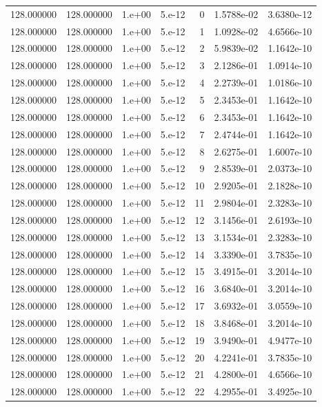 \begin{table}[htbp]
\begin{tabular}{rrrrrrr}
128.000000 & 128.000000 & 1.e+00 & 5.e-12 & 0 & 1.5788e-02 & 3.6380e-12 \\
128.000000 & 128.000000 & 1.e+00 & 5.e-12 & 1 & 1.0928e-02 & 4.6566e-10 \\
128.000000 & 128.000000 & 1.e+00 & 5.e-12 & 2 & 5.9839e-02 & 1.1642e-10 \\
128.000000 & 128.000000 & 1.e+00 & 5.e-12 & 3 & 2.1286e-01 & 1.0914e-10 \\
128.000000 & 128.000000 & 1.e+00 & 5.e-12 & 4 & 2.2739e-01 & 1.0186e-10 \\
128.000000 & 128.000000 & 1.e+00 & 5.e-12 & 5 & 2.3453e-01 & 1.1642e-10 \\
128.000000 & 128.000000 & 1.e+00 & 5.e-12 & 6 & 2.3453e-01 & 1.1642e-10 \\
128.000000 & 128.000000 & 1.e+00 & 5.e-12 & 7 & 2.4744e-01 & 1.1642e-10 \\
128.000000 & 128.000000 & 1.e+00 & 5.e-12 & 8 & 2.6275e-01 & 1.6007e-10 \\
128.000000 & 128.000000 & 1.e+00 & 5.e-12 & 9 & 2.8539e-01 & 2.0373e-10 \\
128.000000 & 128.000000 & 1.e+00 & 5.e-12 & 10 & 2.9205e-01 & 2.1828e-10 \\
128.000000 & 128.000000 & 1.e+00 & 5.e-12 & 11 & 2.9804e-01 & 2.3283e-10 \\
128.000000 & 128.000000 & 1.e+00 & 5.e-12 & 12 & 3.1456e-01 & 2.6193e-10 \\
128.000000 & 128.000000 & 1.e+00 & 5.e-12 & 13 & 3.1534e-01 & 2.3283e-10 \\
128.000000 & 128.000000 & 1.e+00 & 5.e-12 & 14 & 3.3390e-01 & 3.7835e-10 \\
128.000000 & 128.000000 & 1.e+00 & 5.e-12 & 15 & 3.4915e-01 & 3.2014e-10 \\
128.000000 & 128.000000 & 1.e+00 & 5.e-12 & 16 & 3.6840e-01 & 3.2014e-10 \\
128.000000 & 128.000000 & 1.e+00 & 5.e-12 & 17 & 3.6932e-01 & 3.0559e-10 \\
128.000000 & 128.000000 & 1.e+00 & 5.e-12 & 18 & 3.8468e-01 & 3.2014e-10 \\
128.000000 & 128.000000 & 1.e+00 & 5.e-12 & 19 & 3.9490e-01 & 4.9477e-10 \\
128.000000 & 128.000000 & 1.e+00 & 5.e-12 & 20 & 4.2241e-01 & 3.7835e-10 \\
128.000000 & 128.000000 & 1.e+00 & 5.e-12 & 21 & 4.2800e-01 & 4.6566e-10 \\
128.000000 & 128.000000 & 1.e+00 & 5.e-12 & 22 & 4.2955e-01 & 3.4925e-10 \\

\end{tabular}
\end{table}
